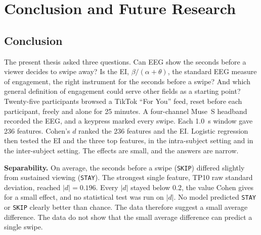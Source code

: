 \documentclass[12pt,a4paper]{report}
\begin{document}
\chapter{Conclusion and Future Research}
\label{chap:conclusion}

\section{Conclusion}
\label{sec:conclusion}

The present thesis asked three questions. Can EEG show the seconds before a viewer decides to swipe away? Is the EI, \(\beta/(\alpha+\theta)\), the standard EEG measure of engagement, the right instrument for the seconds before a swipe? And which general definition of engagement could serve other fields as a starting point? Twenty-five participants browsed a TikTok ``For You'' feed, reset before each participant, freely and alone for 25 minutes. A four-channel Muse~S headband recorded the EEG, and a keypress marked every swipe. Each 1.0~s window gave 236 features. Cohen's \(d\) ranked the 236 features and the EI. Logistic regression then tested the EI and the three top features, in the intra-subject setting and in the inter-subject setting. The effects are small, and the answers are narrow.

\textbf{Separability.} On average, the seconds before a swipe (\texttt{SKIP}) differed slightly from sustained viewing (\texttt{STAY}). The strongest single feature, TP10 raw standard deviation, reached \(|d| = 0.196\). Every \(|d|\) stayed below 0.2, the value Cohen gives for a small effect, and no statistical test was run on \(|d|\). No model predicted \texttt{STAY} or \texttt{SKIP} clearly better than chance. The data therefore suggest a small average difference. The data do not show that the small average difference can predict a single swipe.
\end{document}
